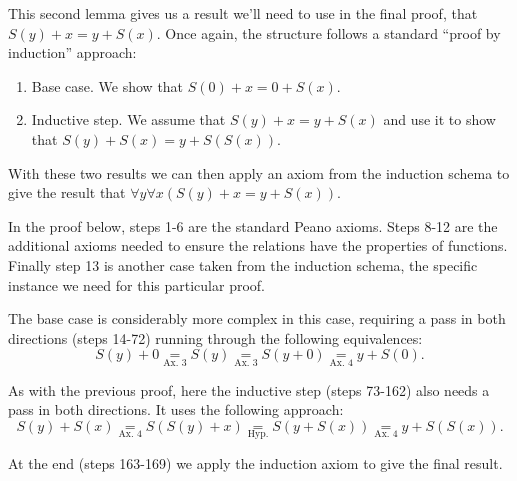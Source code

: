 \documentclass[10pt]{article}
\begin{document}
This second lemma gives us a result we'll need to use in the final proof, that $S(y) + x = y + S(x)$. Once again, the structure follows a standard ``proof by induction'' approach:

\begin{enumerate}
\item Base case. We show that $S(0) + x = 0 + S(x)$.
\item Inductive step. We assume that $S(y) + x = y + S(x)$ and use it to show that $S(y) + S(x) = y + S(S(x))$.
\end{enumerate}

With these two results we can then apply an axiom from the induction schema to give the result that $\forall y \forall x (S(y) + x = y + S(x))$.

In the proof below, steps 1-6 are the standard Peano axioms. Steps 8-12 are the additional axioms needed to ensure the relations have the properties of functions. Finally step 13 is another case taken from the induction schema, the specific instance we need for this particular proof.

The base case is considerably more complex in this case, requiring a pass in both directions (steps 14-72) running through the following equivalences:
$$
S(y) + 0 \underset{\text{Ax. 3}}{=} S(y) \underset{\text{Ax. 3}}{=} S(y + 0) \underset{\text{Ax. 4}}{=} y + S(0).
$$

As with the previous proof, here the inductive step (steps 73-162) also needs a pass in both directions. It uses the following approach:
$$
S(y) + S(x) \underset{\text{Ax. 4}}{=} S(S(y) + x) \underset{\text{Hyp.}}{=} S(y + S(x)) \underset{\text{Ax. 4}}{=} y + S(S(x)).
$$

At the end (steps 163-169) we apply the induction axiom to give the final result.
\end{document}

